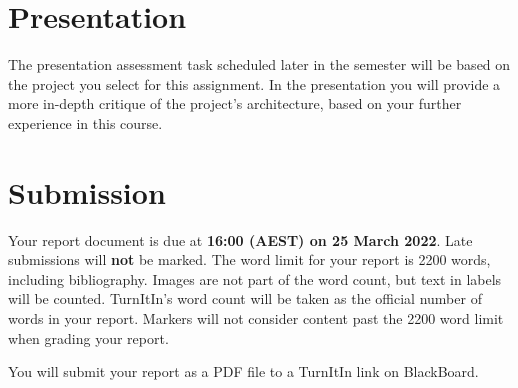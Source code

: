 \documentclass{csse4400}
\begin{document}
\section{Presentation}
The presentation assessment task scheduled later in the semester will be based on the project you select for this assignment.
In the presentation you will provide a more in-depth critique of the project's architecture, based on your further experience in this course.

\pagebreak
\section{Submission}
Your report document is due at \textbf{16:00 (AEST) on 25 March 2022}. Late submissions will \textbf{not} be marked.
The word limit for your report is 2200 words, including bibliography.
Images are not part of the word count, but text in labels will be counted.
TurnItIn's word count will be taken as the official number of words in your report.
Markers will not consider content past the 2200 word limit when grading your report.

You will submit your report as a PDF file to a TurnItIn link on BlackBoard.

%
%
%
\end{document}
